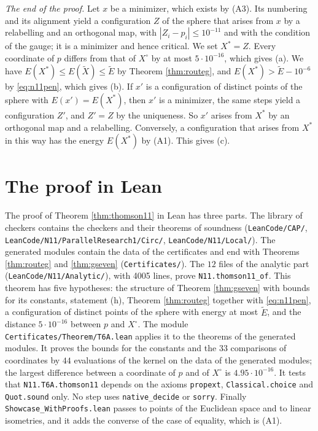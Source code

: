 \documentclass[reqno,a4paper,11pt]{amsart}
\numberwithin{equation}{section}
\newcommand{\lean}[1]{\texttt{#1}}
\newcommand{\file}[1]{\nolinkurl{#1}}
\newcommand{\factNthAnaFiles}{12}
\newcommand{\factNthAnaLines}{4005}
\newcommand{\factNthCoordDiff}{4.95 \cdot 10^{-16}}
\newcommand{\factNthStmtKernelChecks}{44}
\begin{document}
\emph{The end of the proof.} Let $x$ be a minimizer, which exists by (A3). Its numbering and its alignment yield a configuration $Z$ of the sphere that arises from $x$ by a relabelling and an orthogonal map, with $|Z_i - p_i| \leq 10^{-11}$ and with the condition of the gauge; it is a minimizer and hence critical. We set $X^* = Z$. Every coordinate of $p$ differs from that of $X^{\circ}$ by at most $5 \cdot 10^{-16}$, which gives (a). We have $E(X^*) \leq E(\tilde X) \leq \tilde E$ by Theorem \ref{thm:routeg}, and $E(X^*) > \tilde E - 10^{-6}$ by \eqref{eq:n11pen}, which gives (b). If $x'$ is a configuration of distinct points of the sphere with $E(x') = E(X^*)$, then $x'$ is a minimizer, the same steps yield a configuration $Z'$, and $Z' = Z$ by the uniqueness. So $x'$ arises from $X^*$ by an orthogonal map and a relabelling. Conversely, a configuration that arises from $X^*$ in this way has the energy $E(X^*)$ by (A1). This gives (c).

\section{The proof in Lean}\label{sec:lean}

The proof of Theorem \ref{thm:thomson11} in Lean has three parts. The library of checkers contains the checkers and their theorems of soundness (\file{LeanCode/CAP/}, \file{LeanCode/N11/ParallelResearch1/Circ/}, \file{LeanCode/N11/Local/}). The generated modules contain the data of the certificates and end with Theorems \ref{thm:routeg} and \ref{thm:gseven} (\file{Certificates/}). The $\factNthAnaFiles$ files of the analytic part (\file{LeanCode/N11/Analytic/}), with \factNthAnaLines{} lines, prove \lean{N11.thomson11\_of}. This theorem has five hypotheses: the structure of Theorem \ref{thm:gseven} with bounds for its constants, statement (h), Theorem \ref{thm:routeg} together with \eqref{eq:n11pen}, a configuration of distinct points of the sphere with energy at most $\tilde E$, and the distance $5 \cdot 10^{-16}$ between $p$ and $X^{\circ}$. The module \file{Certificates/Theorem/T6A.lean} applies it to the theorems of the generated modules. It proves the bounds for the constants and the $33$ comparisons of coordinates by $\factNthStmtKernelChecks$ evaluations of the kernel on the data of the generated modules; the largest difference between a coordinate of $p$ and of $X^{\circ}$ is $\factNthCoordDiff$. It tests that \lean{N11.T6A.thomson11} depends on the axioms \lean{propext}, \lean{Classical.choice} and \lean{Quot.sound} only. No step uses \lean{native\_decide} or \lean{sorry}. Finally \file{Showcase_WithProofs.lean} passes to points of the Euclidean space and to linear isometries, and it adds the converse of the case of equality, which is (A1).
\end{document}
